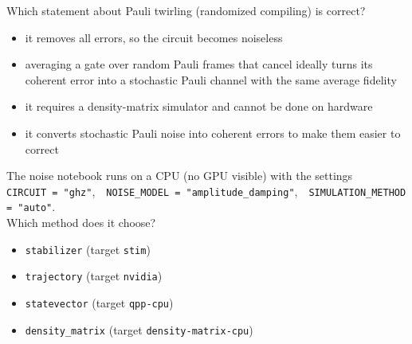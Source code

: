 \documentclass[11pt,a4paper]{article}
\newcommand{\optlabel}[1]{\textbf{(#1)}}
\newenvironment{qitem}[1]{\begin{list}{}{\setlength{\leftmargin}{3.3em}\setlength{\labelwidth}{3.1em}%
  \setlength{\labelsep}{0.2em}\setlength{\topsep}{3pt}\setlength{\parsep}{3pt}}\item[\textbf{Q.#1}\hfill]}{\end{list}}
\newcommand{\qsep}{\par\vspace{2pt}{\color{black!15}\hrule}\vspace{4pt}}
\begin{document}
\begin{qitem}{73}
Which statement about Pauli twirling (randomized compiling) is correct?
\begin{itemize}[leftmargin=2.6em, labelsep=0.4em, itemsep=2pt, topsep=3pt]
\item[\optlabel{A}] it removes all errors, so the circuit becomes noiseless
\item[\optlabel{B}] averaging a gate over random Pauli frames that cancel ideally turns its coherent error into a stochastic Pauli channel with the same average fidelity
\item[\optlabel{C}] it requires a density-matrix simulator and cannot be done on hardware
\item[\optlabel{D}] it converts stochastic Pauli noise into coherent errors to make them easier to correct
\end{itemize}
\end{qitem}
\qsep

\begin{qitem}{74}
The noise notebook runs on a CPU (no GPU visible) with the settings\\
\hspace*{1em}\texttt{CIRCUIT = "ghz"},\ \ \texttt{NOISE\_MODEL = "amplitude\_damping"},\ \ \texttt{SIMULATION\_METHOD = "auto"}.\\
Which method does it choose?
\begin{itemize}[leftmargin=2.6em, labelsep=0.4em, itemsep=2pt, topsep=3pt]
\item[\optlabel{A}] \texttt{stabilizer} (target \texttt{stim})
\item[\optlabel{B}] \texttt{trajectory} (target \texttt{nvidia})
\item[\optlabel{C}] \texttt{statevector} (target \texttt{qpp-cpu})
\item[\optlabel{D}] \texttt{density\_matrix} (target \texttt{density-matrix-cpu})
\end{itemize}
\end{qitem}
\qsep
\end{document}

